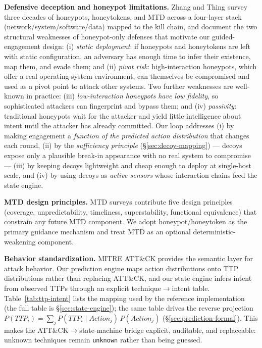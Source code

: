 \documentclass[11pt]{article}
\newcommand{\act}[1]{\texttt{#1}}
\begin{document}
\textbf{Defensive deception and honeypot limitations.} Zhang and Thing
\cite{zhang-thing} survey three decades of honeypots, honeytokens, and MTD
across a four-layer stack (network/system/software/data) mapped to the kill
chain, and document the two structural weaknesses of honeypot-only defenses
that motivate our guided-engagement design: (i) \textit{static deployment}:
if honeypots and honeytokens are left with static configuration, an
adversary has enough time to infer their existence, map them, and evade
them; and (ii) \textit{pivot risk}: high-interaction honeypots, which offer
a real operating-system environment, can themselves be compromised and used
as a pivot point to attack other systems. Two further weaknesses are
well-known in practice: (iii) \textit{low-interaction honeypots have low
fidelity}, so sophisticated attackers can fingerprint and bypass them; and
(iv) \textit{passivity}: traditional honeypots wait for the attacker and
yield little intelligence about intent until the attacker has already
committed. Our loop addresses (i) by making engagement a \textit{function of
the predicted action distribution} that changes each round, (ii) by the
\textit{sufficiency principle} (\S\ref{sec:decoy-mapping}) --- decoys expose
only a plausible break-in appearance with no real system to compromise ---
(iii) by keeping decoys lightweight and cheap enough to deploy at
single-host scale, and (iv) by using decoys as \textit{active sensors} whose
interaction chains feed the state engine.

\textbf{MTD design principles.} MTD surveys \cite{mtd-survey} contribute
five design principles (coverage, unpredictability, timeliness,
superstability, functional equivalence) that constrain any future MTD
component. We adopt honeypot/honeytoken as the primary guidance mechanism
and treat MTD as an optional deterministic-weakening component.

\textbf{Behavior standardization.} MITRE ATT\&CK \cite{attck} provides the
semantic layer for attack behavior. Our prediction engine maps action
distributions onto TTP distributions rather than replacing ATT\&CK, and our
state engine infers intent from observed TTPs through an explicit
technique$\to$intent table. Table~\ref{tab:ttp-intent} lists the mapping
used by the reference implementation (the full table is
\S\ref{sec:state-engine}); the same table drives the reverse projection
$P(\mathit{TTP}_i) = \sum_j P(\mathit{TTP}_i \mid \mathit{Action}_j)\,
P(\mathit{Action}_j)$ (\S\ref{sec:prediction-formal}). This makes the
ATT\&CK$\to$state-machine bridge explicit, auditable, and replaceable:
unknown techniques remain \act{unknown} rather than being guessed.
\end{document}
